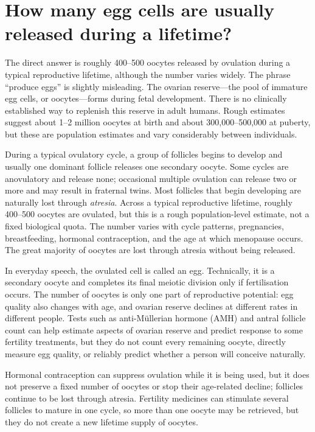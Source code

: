\documentclass[11pt,oneside]{report}
\begin{document}
\section{How many egg cells are usually released during a lifetime?}

The direct answer is roughly 400--500 oocytes released by ovulation during a
typical reproductive lifetime, although the number varies widely. The phrase
``produce eggs'' is slightly misleading. The ovarian reserve---the
pool of immature egg cells, or oocytes---forms during fetal development. There
is no clinically established way to replenish this reserve in adult humans.
Rough estimates suggest about 1--2 million oocytes at birth and about
300,000--500,000 at puberty, but these are population estimates and vary
considerably between individuals.

During a typical ovulatory cycle, a group of follicles begins to develop and
usually one dominant follicle releases one secondary oocyte. Some cycles are
anovulatory and release none; occasional multiple ovulation can release two or
more and may result in fraternal twins. Most follicles that begin developing
are naturally lost through \emph{atresia}. Across a typical reproductive
lifetime, roughly 400--500 oocytes are ovulated, but this is a rough
population-level estimate, not a fixed biological quota. The number varies with
cycle patterns, pregnancies, breastfeeding, hormonal contraception, and the
age at which menopause occurs. The great majority of oocytes are lost through
atresia without being released.

In everyday speech, the ovulated cell is called an egg. Technically, it is a
secondary oocyte and completes its final meiotic division only if fertilisation
occurs. The number of oocytes is only one part of reproductive potential: egg
quality also changes with age, and ovarian reserve declines at different rates
in different people. Tests such as anti-Müllerian hormone (AMH) and antral
follicle count can help estimate aspects of ovarian reserve and predict response
to some fertility treatments, but they do not count every remaining oocyte,
directly measure egg quality, or reliably predict whether a person will conceive
naturally.

Hormonal contraception can suppress ovulation while it is being used, but it
does not preserve a fixed number of oocytes or stop their age-related decline;
follicles continue to be lost through atresia. Fertility medicines can stimulate
several follicles to mature in one cycle, so more than one oocyte may be
retrieved, but they do not create a new lifetime supply of oocytes.
\end{document}
